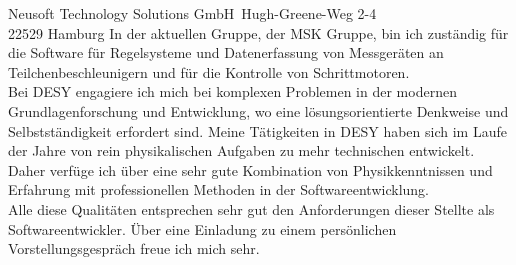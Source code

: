 \documentclass[ebner,paper=a4,fontsize=11pt,ngerman,BCOR=10mm]{scrlttr2}%
\begin{document}
\begin{letter}{Neusoft Technology Solutions GmbH\
Hugh-Greene-Weg 2-4\\
22529 Hamburg}
In der aktuellen Gruppe, der MSK Gruppe, bin ich zust{\"a}ndig f{\"u}r die
Software f{\"u}r Regelsysteme und Datenerfassung von Messger{\"a}ten an
Teilchenbeschleunigern und f{\"u}r die Kontrolle von Schrittmotoren.\\
\indent Bei DESY engagiere ich mich bei komplexen Problemen in der modernen
Grundlagenforschung und Entwicklung, wo eine l{\"o}sungsorientierte Denkweise
und Selbstst\"andigkeit erfordert sind. Meine T{\"a}tigkeiten in DESY haben sich
im Laufe der Jahre von rein physikalischen Aufgaben zu mehr technischen
entwickelt. Daher verf{\"u}ge ich {\"u}ber eine sehr gute Kombination von
Physikkenntnissen und Erfahrung mit professionellen Methoden in der
Softwareentwicklung.\\
\indent Alle diese Qualit{\"a}ten entsprechen sehr gut den Anforderungen
dieser Stellte als Softwareentwickler. \"Uber eine Einladung zu
einem pers\"onlichen Vorstellungsgespr\"ach freue ich mich sehr.


\end{letter}
\end{document}
